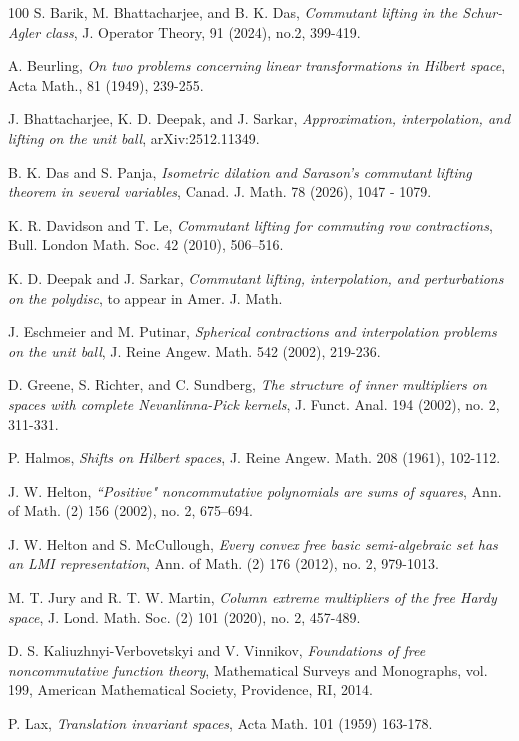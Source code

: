 \documentclass[12pt]{amsart}%
\numberwithin{equation}{section}
\begin{document}
\begin{thebibliography}{100}
  S. Barik, M. Bhattacharjee, and B. K. Das,  {\em Commutant lifting in the Schur-Agler class}, J. Operator Theory, 91 (2024), no.2, 399-419.

 A. Beurling, {\em On two problems concerning linear transformations in Hilbert space}, Acta Math., 81 (1949), 239-255.

 J. Bhattacharjee, K. D. Deepak, and J. Sarkar, {\em Approximation, interpolation, and lifting on the unit ball}, arXiv:2512.11349.

  B. K. Das and S. Panja, {\em Isometric dilation and Sarason’s commutant lifting theorem in several variables},  Canad. J. Math. 78 (2026), 1047 - 1079.

 K. R. Davidson and T. Le, {\em Commutant lifting for commuting row contractions}, Bull. London Math. Soc. 42 (2010), 506–516.



 K. D. Deepak and J. Sarkar, {\em Commutant lifting, interpolation, and perturbations on the polydisc}, to appear in Amer. J. Math.

 J. Eschmeier and M. Putinar, {\em Spherical contractions and interpolation problems on
the unit ball}, J. Reine Angew. Math. 542 (2002), 219-236.

 D. Greene, S. Richter, and C. Sundberg, {\em The structure of inner multipliers on spaces with complete Nevanlinna-Pick kernels}, J. Funct. Anal. 194 (2002), no. 2, 311-331.

 P. Halmos, {\em Shifts on Hilbert spaces}, J. Reine Angew. Math. 208 (1961), 102-112.

 J. W. Helton, {\em  ``Positive" noncommutative polynomials are sums of squares}, Ann. of Math. (2) 156 (2002), no. 2, 675–694.

 J. W. Helton and S. McCullough, {\em Every convex free basic semi-algebraic set has an LMI representation}, Ann. of Math. (2) 176 (2012), no. 2, 979-1013.


 M. T. Jury and R. T. W. Martin, {\em Column extreme multipliers of the free Hardy space}, J. Lond. Math. Soc. (2) 101 (2020), no. 2, 457-489.

 D. S. Kaliuzhnyi-Verbovetskyi and V. Vinnikov, {\em Foundations of free noncommutative function theory}, Mathematical Surveys and Monographs, vol. 199, American Mathematical Society, Providence, RI, 2014.

 P. Lax, {\em Translation invariant spaces}, Acta Math. 101 (1959) 163-178.


\end{thebibliography}
\end{document}
